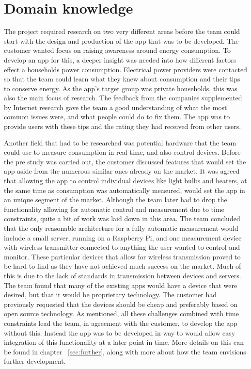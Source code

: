 \section{Domain knowledge}
The project required research on two very different areas before the team could start with the design and production of the app that was to be developed. The customer wanted focus on raising awareness around energy consumption. To develop an app for this, a deeper insight was needed into how different factors effect a households  power consumption. Electrical power providers were contacted so that the team could learn what they knew about consumption and their tips to conserve energy. As the app's target group was private households, this was also the main focus of research. The feedback from the companies supplemented by Internet research gave the team a good understanding of what the most common issues were, and what people could do to fix them. The app was to provide users with these tips and the rating they had received from other users. 

Another field that had to be researched was potential hardware that the team could use to measure consumption in real time, and also control devices. Before the pre study was carried out, the customer discussed features that would set the app aside from the numerous similar ones already on the market. It was agreed that allowing the app to control individual devices like light bulbs and heaters, at the same time as consumption was automatically measured, would set the app in an unique segment of the market. Although the team later had to drop the functionality allowing for automatic control and measurement due to time constraints, quite a bit of work was laid down in this area. The team concluded that the only reasonable architecture for a fully automatic measurement would include a small server, running on a Raspberry Pi, and one measurement device with wireless transmitter connected to anything the user wanted to control and monitor. These particular devices that allow for wireless transmission proved to be hard to find as they have not achieved much success on the market. Much of this is due to the lack of standards in transmission between devices and servers. The team found that many of the existing apps would have a device that were desired, but that it would be proprietary technology. The customer had previously requested that the devices should be cheap and preferably based on open source technology. As mentioned, all these challenges combined with time constraints lead the team, in agreement with the customer, to develop the app without  this. Instead the app was to be developed in way to would allow easy integration of this functionality at a later point in time. More details on this can be found in chapter ~\ref{sec:further}, along with more about how the team envisions further development. 